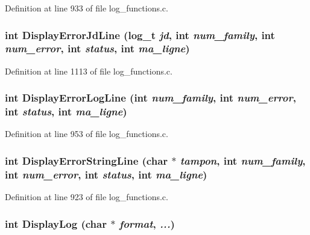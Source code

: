 Definition at line 933 of file log\_\-functions.c.
\subsubsection[{DisplayErrorJdLine}]{\setlength{\rightskip}{0pt plus 5cm}int DisplayErrorJdLine (log\_\-t {\em jd}, \/  int {\em num\_\-family}, \/  int {\em num\_\-error}, \/  int {\em status}, \/  int {\em ma\_\-ligne})}\label{log__functions_8c_f36003798e7e27dbc050ade3589abe73}




Definition at line 1113 of file log\_\-functions.c.
\subsubsection[{DisplayErrorLogLine}]{\setlength{\rightskip}{0pt plus 5cm}int DisplayErrorLogLine (int {\em num\_\-family}, \/  int {\em num\_\-error}, \/  int {\em status}, \/  int {\em ma\_\-ligne})}\label{log__functions_8c_6f79edf64c530e59fc18a7338b5a71fb}




Definition at line 953 of file log\_\-functions.c.
\subsubsection[{DisplayErrorStringLine}]{\setlength{\rightskip}{0pt plus 5cm}int DisplayErrorStringLine (char $\ast$ {\em tampon}, \/  int {\em num\_\-family}, \/  int {\em num\_\-error}, \/  int {\em status}, \/  int {\em ma\_\-ligne})}\label{log__functions_8c_85682e82ad46217de3f3408acf13553f}




Definition at line 923 of file log\_\-functions.c.
\subsubsection[{DisplayLog}]{\setlength{\rightskip}{0pt plus 5cm}int DisplayLog (char $\ast$ {\em format}, \/   {\em ...})}\label{log__functions_8c_0fd1034c6fcec83f3b2379d10083f01e}




